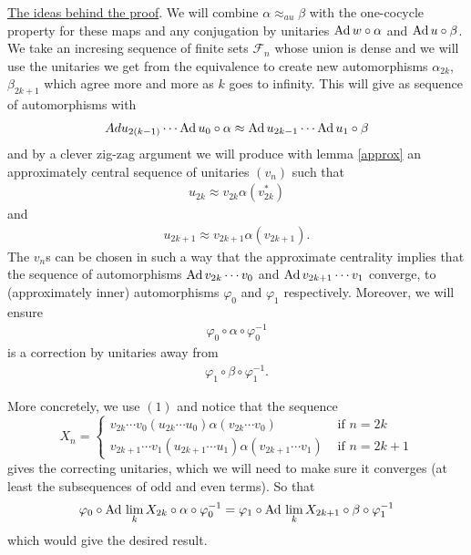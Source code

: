 \documentclass[11pt,a4paper,oneside]{amsart}
\newcommand{\Ad}{{\rm Ad\,}}
\begin{document}
\begin{tcolorbox}[colback= Cyan! 20] 
\underline{The ideas behind the proof}. We will combine $\alpha \approx_{au}\beta$ with the one-cocycle property for these maps and any conjugation by unitaries $\Ad w\circ \alpha$ and $\Ad u\circ \beta$.  We take an incresing sequence of finite sets $\mathcal F_n$ whose union is dense and we will use the unitaries  we get from the equivalence to create new automorphisms $\alpha_{2k}$, $\beta_{2k+1}$ which agree more and more as $k$ goes to infinity. This will give as sequence of automorphisms with \begin{align}Ad u_{2(k-1)}\cdots \Ad u_0\circ \alpha \approx \Ad u_{2k-1}\cdots \Ad u_1\circ \beta\end{align} and by a clever zig-zag argument we will produce with lemma \ref{approx} an approximately central sequence of unitaries $(v_n)$ such that \begin{align}
u_{2k} \approx v_{2k}\alpha(v_{2k}^*)
\end{align} and \begin{align}
u_{2k+1}\approx v_{2k+1}\alpha(v_{2k+1}).
\end{align} The $v_n$s can be chosen in such a way that the approximate centrality implies that the sequence of automorphisms $\Ad v_{2k}\cdots v_0$ and $\Ad v_{2k+1}\cdots v_1$ converge, to (approximately inner) automorphisms $\varphi_0$ and $\varphi_1$ respectively.  Moreover, we will ensure 
\begin{align}
\varphi_0\circ\alpha\circ\varphi_0^{-1} \end{align} is a correction by unitaries away from \begin{align}
\varphi_1\circ\beta\circ\varphi_1^{-1}.
\end{align} 

More concretely, we use $(1)$ and notice that the sequence $$X_n=\begin{cases} v_{2k}\cdots v_0 (u_{2k}\cdots u_0) \alpha(v_{2k}\cdots v_0)& \text{ if } n=2k \\v_{2k+1}\cdots v_1 (u_{2k+1}\cdots u_1) \alpha(v_{2k+1}\cdots v_1)& \text{ if } n=2k+1\end{cases}$$ gives the correcting unitaries, which we will need to make sure it converges (at least the subsequences of odd and even terms). So that $$\varphi_0\circ \Ad  \lim_k X_{2k} \circ \alpha \circ \varphi_0^{-1}= \varphi_1\circ \Ad \lim_k X_{2k+1} \circ \beta \circ \varphi_1^{-1}$$ which would give the desired result.
\end{tcolorbox}
\end{document}
